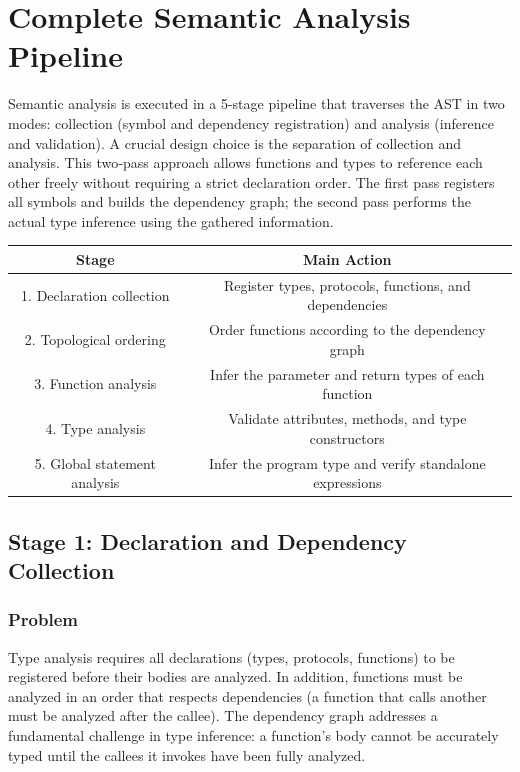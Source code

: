 \documentclass[12pt,a4paper]{report}
\begin{document}
\section{Complete Semantic Analysis Pipeline}

Semantic analysis is executed in a 5-stage pipeline that traverses the AST in two modes: collection (symbol and dependency registration) and analysis (inference and validation).
A crucial design choice is the separation of collection and analysis. This two‑pass approach allows functions and types to reference each other freely without requiring a strict declaration order.
 The first pass registers all symbols and builds the dependency graph;
 the second pass performs the actual type inference using the gathered information.


\begin{center}
\begin{tabular}{c c}
\textbf{Stage} & \textbf{Main Action} \\
\hline
1. Declaration collection & Register types, protocols, functions, and dependencies \\
2. Topological ordering & Order functions according to the dependency graph \\
3. Function analysis & Infer the parameter and return types of each function \\
4. Type analysis & Validate attributes, methods, and type constructors \\
5. Global statement analysis & Infer the program type and verify standalone expressions \\
\end{tabular}
\end{center}

\subsection{Stage 1: Declaration and Dependency Collection}

\subsubsection{Problem}
Type analysis requires all declarations (types, protocols, functions) to be registered before their bodies are analyzed.
In addition, functions must be analyzed in an order that respects dependencies (a function that calls another must be analyzed after the callee).
The dependency graph addresses a fundamental challenge in type inference: a function's body cannot be accurately typed until the callees it invokes have been fully analyzed.
\end{document}
